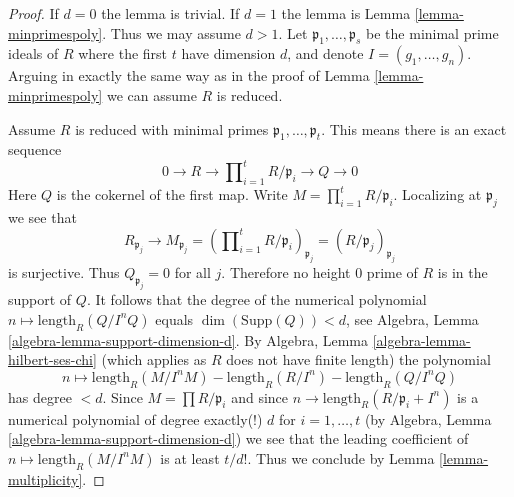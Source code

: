 \documentclass[10pt,a4paper]{amsart}
\theoremstyle{plain}
\theoremstyle{definition}
\theoremstyle{remark}
\numberwithin{equation}{subsection}
\begin{document}
\begin{proof}
If $d = 0$ the lemma is trivial. If $d = 1$ the lemma is
Lemma \ref{lemma-minprimespoly}. Thus we may assume $d > 1$.
Let $\mathfrak p_1, \ldots, \mathfrak p_s$ be the minimal prime ideals of
$R$ where the first $t$ have dimension $d$, and denote
$I = (g_1, \ldots, g_n)$. Arguing in exactly the same way as in
the proof of Lemma \ref{lemma-minprimespoly} we can assume $R$ is reduced.

\medskip\noindent
Assume $R$ is reduced with minimal primes
$\mathfrak p_1, \ldots, \mathfrak p_t$.
This means there is an exact sequence
$$
0 \to R \to
\prod\nolimits_{i = 1}^t R/\mathfrak p_i \to Q \to 0
$$
Here $Q$ is the cokernel of the first map.
Write $M = \prod_{i = 1}^t R/\mathfrak p_i$.
Localizing at $\mathfrak p_j$ we see that
$$
R_{\mathfrak p_j} \to M_{\mathfrak p_j} =
\left(\prod\nolimits_{i=1}^t R/\mathfrak p_i\right)_{\mathfrak p_j} =
(R/\mathfrak p_j)_{\mathfrak p_j}
$$
is surjective. Thus $Q_{\mathfrak p_j} = 0$ for all $j$. Therefore no
height $0$ prime of $R$ is in the support of $Q$. It follows that
the degree of the numerical polynomial
$n \mapsto \text{length}_R(Q/I^nQ)$ equals $\dim(\text{Supp}(Q)) < d$, see
Algebra, Lemma \ref{algebra-lemma-support-dimension-d}.
By Algebra, Lemma \ref{algebra-lemma-hilbert-ses-chi}
(which applies as $R$ does not have finite length) the polynomial
$$
n \longmapsto
\text{length}_R(M/I^nM) - \text{length}_R(R/I^n) - \text{length}_R(Q/I^nQ)
$$
has degree $< d$. Since $M = \prod R/\mathfrak p_i$ and since
$n \to \text{length}_R(R/\mathfrak p_i + I^n)$ is a numerical
polynomial of degree exactly(!) $d$ for $i = 1, \ldots, t$ (by
Algebra, Lemma \ref{algebra-lemma-support-dimension-d})
we see that the leading coefficient of $n \mapsto \text{length}_R(M/I^nM)$
is at least $t/d!$. Thus we conclude by Lemma \ref{lemma-multiplicity}.
\end{proof}
\end{document}
